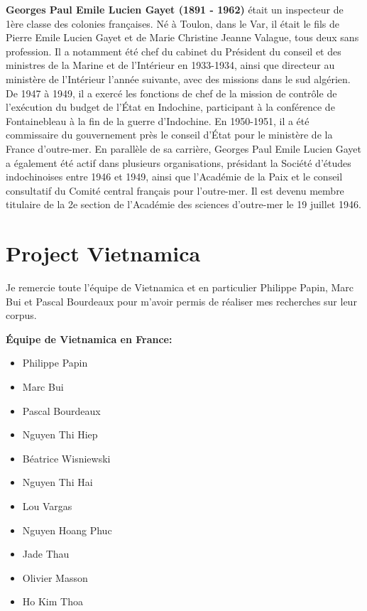 \textbf{Georges Paul Emile Lucien Gayet (1891 - 1962)} était un inspecteur de 1ère classe des colonies françaises. Né à Toulon, dans le Var, il était le fils de Pierre Emile Lucien Gayet et de Marie Christine Jeanne Valague, tous deux sans profession.
Il a notamment été chef du cabinet du Président du conseil et des ministres de la Marine et de l'Intérieur en 1933-1934, ainsi que directeur au ministère de l'Intérieur l'année suivante, avec des missions dans le sud algérien.
De 1947 à 1949, il a exercé les fonctions de chef de la mission de contrôle de l'exécution du budget de l'État en Indochine, participant à la conférence de Fontainebleau à la fin de la guerre d'Indochine. En 1950-1951, il a été commissaire du gouvernement près le conseil d'État pour le ministère de la France d'outre-mer.
En parallèle de sa carrière, Georges Paul Emile Lucien Gayet a également été actif dans plusieurs organisations, présidant la Société d'études indochinoises entre 1946 et 1949, ainsi que l'Académie de la Paix et le conseil consultatif du Comité central français pour l'outre-mer.
Il est devenu membre titulaire de la 2e section de l'Académie des sciences d'outre-mer le 19 juillet 1946.


\newpage 
\section{Project Vietnamica}\label{chapitre}

\bigskip

Je remercie toute l'équipe de Vietnamica et en particulier Philippe Papin, Marc Bui et Pascal Bourdeaux pour m'avoir permis de réaliser mes recherches sur leur corpus. 

\bigskip

\textbf{Équipe de Vietnamica en France:}
\begin{itemize}
    \item Philippe Papin
    \item Marc Bui
    \item Pascal Bourdeaux
    \item Nguyen Thi Hiep
    \item Béatrice Wisniewski
    \item Nguyen Thi Hai
    \item Lou Vargas
    \item Nguyen Hoang Phuc
    \item Jade Thau
    \item Olivier Masson
    \item Ho Kim Thoa
\end{itemize}

